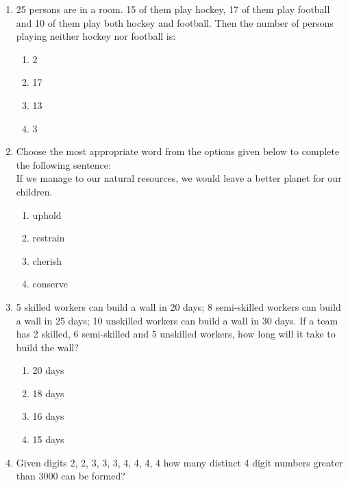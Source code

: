 \documentclass[a4paper,10pt]{article}
\begin{document}
\begin{enumerate}
\item 25 persons are in a room. 15 of them play hockey, 17 of them play football and 10 of them play both hockey and football. Then the number of persons playing neither hockey nor football is:
\hfill{}

\begin{multicols}{4}
\begin{enumerate}
\item 2
\item 17
\item 13
\item 3
\end{enumerate}
\end{multicols}

\item Choose the most appropriate word from the options given below to complete the following sentence: \\
If we manage to \underline{\hspace{2cm}} our natural resources, we would leave a better planet for our children.
\hfill{}

\begin{multicols}{4}
\begin{enumerate}
\item uphold
\item restrain
\item cherish
\item conserve
\end{enumerate}
\end{multicols}

\item 5 skilled workers can build a wall in 20 days; 8 semi-skilled workers can build a wall in 25 days; 10 unskilled workers can build a wall in 30 days. If a team has 2 skilled, 6 semi-skilled and 5 unskilled workers, how long will it take to build the wall?
\hfill{}

\begin{multicols}{4}
\begin{enumerate}
\item 20 days
\item 18 days
\item 16 days
\item 15 days
\end{enumerate}
\end{multicols}

\item Given digits 2, 2, 3, 3, 3, 4, 4, 4, 4 how many distinct 4 digit numbers greater than 3000 can be formed?
\hfill{}


\end{enumerate}
\end{document}

